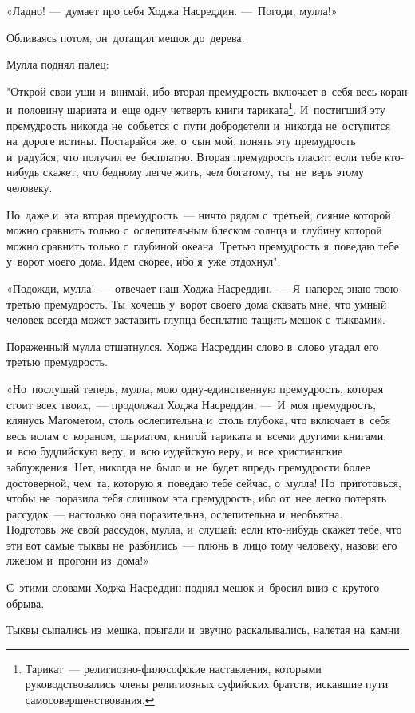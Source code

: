 \documentclass[12pt,a4paper]{book}
\begin{document}
«Ладно! —~думает про себя Ходжа Насреддин. —~Погоди, мулла!»

Обливаясь потом, он~дотащил мешок до~дерева.

Мулла поднял палец:

"Открой свои уши и~внимай, ибо вторая премудрость включает в~себя весь коран и~половину шариата и~еще одну четверть книги тариката\footnote{Тарикат~— религиозно-философские наставления, которыми руководствовались члены религиозных суфийских братств, искавшие пути самосовершенствования.}. И~постигший эту премудрость никогда не~собьется с~пути добродетели и~никогда не~оступится на~дороге истины. Постарайся~же, о~сын мой, понять эту премудрость и~радуйся, что получил ее~бесплатно. Вторая премудрость гласит: если тебе кто-нибудь скажет, что бедному легче жить, чем богатому, ты~не~верь этому человеку.

Но~даже и~эта вторая премудрость~— ничто рядом с~третьей, сияние которой можно сравнить только с~ослепительным блеском солнца и~глубину которой можно сравнить только с~глубиной океана. Третью премудрость я~поведаю тебе у~ворот моего дома. Идем скорее, ибо я~уже отдохнул".

«Подожди, мулла! —~отвечает наш Ходжа Насреддин. —~Я~наперед знаю твою третью премудрость. Ты~хочешь у~ворот своего дома сказать мне, что умный человек всегда может заставить глупца бесплатно тащить мешок с~тыквами».

Пораженный мулла отшатнулся. Ходжа Насреддин слово в~слово угадал его третью премудрость.

«Но~послушай теперь, мулла, мою одну-единственную премудрость, которая стоит всех твоих,~— продолжал Ходжа Насреддин. —~И~моя премудрость, клянусь Магометом, столь ослепительна и~столь глубока, что включает в~себя весь ислам с~кораном, шариатом, книгой тариката и~всеми другими книгами, и~всю буддийскую веру, и~всю иудейскую веру, и~все христианские заблуждения. Нет, никогда не~было и~не~будет впредь премудрости более достоверной, чем~та, которую я~поведаю тебе сейчас, о~мулла! Но~приготовься, чтобы не~поразила тебя слишком эта премудрость, ибо от~нее легко потерять рассудок~— настолько она поразительна, ослепительна и~необъятна. Подготовь~же свой рассудок, мулла, и~слушай: если кто-нибудь скажет тебе, что эти вот самые тыквы не~разбились~— плюнь в~лицо тому человеку, назови его лжецом и~прогони из~дома!»

С~этими словами Ходжа Насреддин поднял мешок и~бросил вниз с~крутого обрыва.

Тыквы сыпались из~мешка, прыгали и~звучно раскалывались, налетая на~камни.
\end{document}
